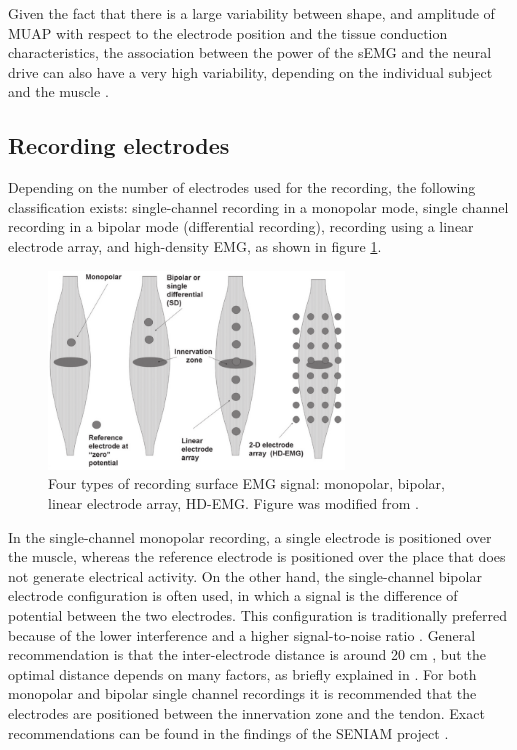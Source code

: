 Given the fact that there is a large variability between shape, and amplitude of MUAP with respect to the electrode position and the tissue conduction characteristics, the association between the power of the sEMG and the neural drive can also have a very high variability, depending on the individual subject and the muscle \citep{Farina2014}. 

\subsection{Recording electrodes}
Depending on the number of electrodes used for the recording, the following classification exists: single-channel recording in a monopolar mode, single channel recording in a bipolar mode (differential recording), recording using a linear electrode array, and high-density EMG, as shown in figure \ref{fig:electrode_types}.
\begin{figure}[ht]
\centering
\includegraphics[width=0.70\textwidth]{Images/introduction/electrode_types.png}
\caption{Four types of recording surface EMG signal: monopolar, bipolar, linear electrode array, HD-EMG. Figure was modified from \citet{Merletti2010}.}
\label{fig:electrode_types}
\end{figure}

In the single-channel monopolar recording, a single electrode is positioned over the muscle, whereas the reference electrode is positioned over the place that does not generate electrical activity. On the other hand, the single-channel bipolar electrode configuration is often used, in which a signal is the difference of potential between the two electrodes. This configuration is traditionally preferred because of the lower interference and a higher signal-to-noise ratio \citep{Merletti-book}. General recommendation is that the inter-electrode distance is around 20 cm \citep{Hermens1999}, but the optimal distance depends on many factors, as briefly explained in \citep{Hakonen2015}. For both monopolar and bipolar single channel recordings it is recommended that the electrodes are positioned between the innervation zone and the tendon. Exact recommendations can be found in the findings of the SENIAM project \citep{Hermens1999}.

